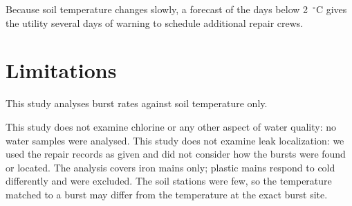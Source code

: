 \documentclass{article}
\begin{document}
Because soil temperature changes slowly, a forecast of the days below
2~$^\circ$C gives the utility several days of warning to schedule additional
repair crews.

\section{Limitations}
\label{sec:limitations}

This study analyses burst rates against soil temperature only.

This study does not examine chlorine or any other aspect of water quality: no
water samples were analysed. This study does not examine leak localization:
we used the repair records as given and did not consider how the bursts were
found or located. The analysis covers iron mains only; plastic mains respond to
cold differently and were excluded. The soil stations were few, so the
temperature matched to a burst may differ from the temperature at the exact
burst site.
\end{document}
